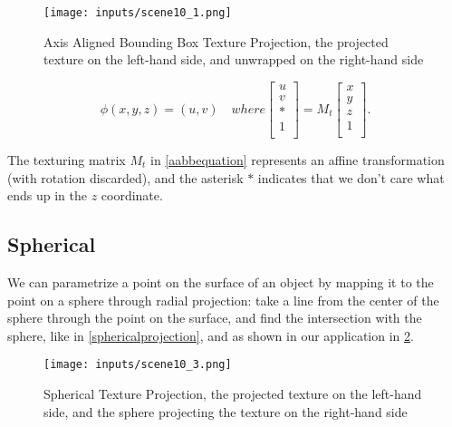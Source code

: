 \documentclass[cic,tc,english]{iiufrgs}
\begin{document}
\begin{figure}[hbt!]
    \caption{Axis Aligned Bounding Box Texture Projection, the projected texture on the left-hand side, and unwrapped on the right-hand side}
    \begin{center}
        \texttt{[image: inputs/scene10\_1.png]}
    \end{center}
    \label{aabbtextureprojection}
\end{figure}

\begin{equation}
    \phi(x,y,z) = (u,v) \quad where
    \begin{bmatrix}
        u \\
        v \\
        * \\
        1 \\
    \end{bmatrix}
    =
    M_t
    \begin{bmatrix}
        x \\
        y \\
        z \\
        1 \\
    \end{bmatrix}
    .
    \label{aabbequation}
\end{equation}

The texturing matrix $M_t$ in \cref{aabbequation} represents an affine transformation (with rotation discarded), and the asterisk $*$ indicates that we don’t care what ends up in the $z$ coordinate. \cite{Marschner2021CGFundamentals}

\subsection{Spherical}

We can parametrize a point on the surface of an object by mapping it to the point on a sphere through radial projection: take a line from the center of the sphere through the point on the surface, and find the intersection with the sphere, like in \cref{sphericalprojection}, and as shown in our application in \cref{sphericaltextureprojectiondemo}.

\begin{figure}[hbt!]
    \caption{Spherical Texture Projection, the projected texture on the left-hand side, and the sphere projecting the texture on the right-hand side}
    \begin{center}
        \texttt{[image: inputs/scene10\_3.png]}
    \end{center}
    \label{sphericaltextureprojectiondemo}
\end{figure}
\end{document}
